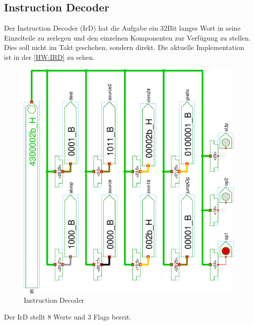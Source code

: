 \subsection{Instruction Decoder}
Der Instruction Decoder (IrD) hat die Aufgabe ein 32Bit langes Wort in seine Einzelteile zu zerlegen und den einzelnen Komponenten zur Verfügung zu stellen. Dies soll nicht im Takt geschehen, sondern direkt. Die aktuelle Implementation ist in der \autoref{HW:IRD} zu sehen.\\
\begin{figure}[!h]
\centering
\hspace{-5em}
\includegraphics[width=1\textwidth,angle=270]{images/ir.eps}
\caption{\label{HW:IRD}Instruction Decoder}
\end{figure}%
Der IrD stellt 8 Werte und 3 Flags bereit.

